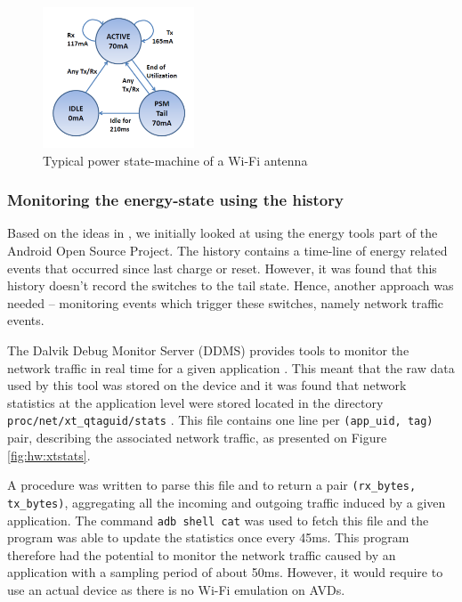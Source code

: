 \begin{figure}
\centering
\includegraphics[width=0.4\textwidth]{figures/wifi_statemachine.png}
\caption{Typical power state-machine of a Wi-Fi antenna}
\label{fig:hw:statemachine}
\vspace {-0.32in}
\end{figure}

\subsubsection{Monitoring the energy-state using the \batterystats{} 
history}

Based on the ideas in \cite{petra}, we initially looked at using the 
energy tools part of the Android Open Source Project. The 
\batterystats{} history contains a time-line of energy related events 
that occurred since last charge or reset. However, it was found that 
this history doesn't record the switches to the tail state. Hence, 
another approach was needed -- monitoring events which trigger these 
switches, namely network traffic events.

The Dalvik Debug Monitor Server (DDMS) provides tools to monitor the 
network traffic in real time for a given application \cite{ddmstrafic}. 
This meant that the raw data used by this tool was stored on the device 
and it was found that network statistics at the application level were 
stored located in the directory \texttt{proc/net/xt\_qtaguid/stats} 
\cite{netxtqtaguid}. This file contains one line per \texttt{(app\_uid, 
tag)} pair, describing the associated network traffic, as presented on 
Figure \ref{fig:hw:xtstats}.

A \python{} procedure was written to parse this file and to return a 
pair \texttt{(rx\_bytes, tx\_bytes)}, aggregating all the incoming and 
outgoing traffic induced by a given application. The command \texttt{adb 
shell cat} was used to fetch this file and the program was able to 
update the statistics once every 45ms. This program therefore had the 
potential to monitor the network traffic caused by an application with a 
sampling period of about 50ms. However, it would require to use an 
actual device as there is no Wi-Fi emulation on AVDs.

